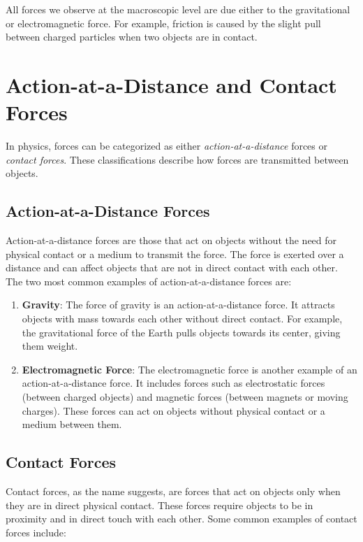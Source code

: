\documentclass[11pt]{article}
\begin{document}
All forces we observe at the macroscopic level are due either to the gravitational or electromagnetic force. For example, friction is caused by the slight pull between charged particles when two objects are in contact.

\section{Action-at-a-Distance and Contact Forces}

In physics, forces can be categorized as either \textit{action-at-a-distance} forces or \textit{contact forces}. These classifications describe how forces are transmitted between objects.

\subsection{Action-at-a-Distance Forces}

Action-at-a-distance forces are those that act on objects without the need for physical contact or a medium to transmit the force. The force is exerted over a distance and can affect objects that are not in direct contact with each other. The two most common examples of action-at-a-distance forces are:

\begin{enumerate}
\item \textbf{Gravity}: The force of gravity is an action-at-a-distance force. It attracts objects with mass towards each other without direct contact. For example, the gravitational force of the Earth pulls objects towards its center, giving them weight.

\item \textbf{Electromagnetic Force}: The electromagnetic force is another example of an action-at-a-distance force. It includes forces such as electrostatic forces (between charged objects) and magnetic forces (between magnets or moving charges). These forces can act on objects without physical contact or a medium between them.

\end{enumerate}

\subsection{Contact Forces}

Contact forces, as the name suggests, are forces that act on objects only when they are in direct physical contact. These forces require objects to be in proximity and in direct touch with each other. Some common examples of contact forces include:
\end{document}
